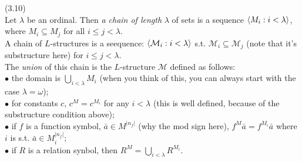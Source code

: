 \documentclass[a4paper]{article}
\begin{document}
\begin{defi} (3.10)\\
    Let $\lambda$ be an ordinal. Then \emph{a chain of length} $\lambda$ of sets is a sequence $\langle M_i : i < \lambda \rangle$, where $M_i \subseteq M_j$ for all $i \leq j < \lambda$.\\
    A chain of $L$-structures is a seequence: $\langle \mathcal{M}_i: i < \lambda \rangle$ s.t. $\mathcal{M}_i \subseteq \mathcal{M}_j$ (note that it's substructure here) for $i \leq j < \lambda$.\\
    The \emph{union} of this chain is the $L$-structure $\mathcal{M}$ defined as follows:\\
    $\bullet$ the domain is $\bigcup_{i<\lambda} M_i$ (when you think of this, you can always start with the case $\lambda = \omega$);\\
    $\bullet$ for constants $c$, $c^M = c^{M_i}$ for any $i<\lambda$ (this is well defined, because of the substructure condition above);\\
    $\bullet$ if $f$ is a function symbol, $\bar{a} \in M^{|n_f|}$ (why the mod sign here), $f^M \bar{a} = f^{M_i} \bar{a}$ where $i$ is s.t. $\bar{a} \in M_i^{|n_f|}$;\\
    $\bullet$ if $R$ is a relation synbol, then $R^M = \bigcup_{i < \lambda} R^{M_i}$.
\end{defi}
\end{document}

